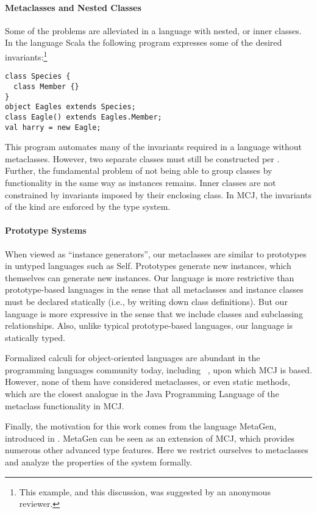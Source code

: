 \documentclass[10pt]{acm-sigplan}
\begin{document}
\paragraph{Metaclasses and Nested Classes}
Some of the problems are alleviated in a language with nested, or
inner classes.  In the language Scala \cite{Scala} the following
program expresses some of the desired invariants:\footnote{This
  example, and this discussion, was suggested by an anonymous
  reviewer.}


\begin{verbatim}
class Species {
  class Member {}
}
object Eagles extends Species;
class Eagle() extends Eagles.Member;
val harry = new Eagle;
\end{verbatim}

This program automates many of the invariants required in a language
without metaclasses.  However, two separate classes must still be
constructed per .  Further, the fundamental problem of
not being able to group classes by functionality in the same way as
instances remains.  Inner classes are not constrained by
invariants imposed by their enclosing class.  In MCJ, the invariants of the
kind are enforced by the type system.  

\paragraph{Prototype Systems}
When viewed as ``instance generators'', our metaclasses are similar to
prototypes in untyped languages such as Self.  Prototypes generate new
instances, which themselves can generate new instances.  Our language
is more restrictive than prototype-based languages in the sense that
all metaclasses and instance classes must be declared statically
(i.e., by writing down class definitions).  But our language is more
expressive in the sense that we include classes and subclassing
relationships.  Also, unlike typical prototype-based languages, our
language is statically typed.

Formalized calculi for object-oriented languages are abundant in the
programming languages community today, including \FJ\ \cite{FJ}, upon
which MCJ is based.  However, none of them have considered
metaclasses, or even static methods, which are the closest analogue in
the Java Programming Language of the metaclass functionality in MCJ.

Finally, the motivation for this work comes from the language MetaGen,
introduced in \cite{DimUnits}.  MetaGen can be seen as an extension of
MCJ, which provides numerous other advanced type features.  Here we
restrict ourselves to metaclasses and analyze the properties of the
system formally.
\end{document}
